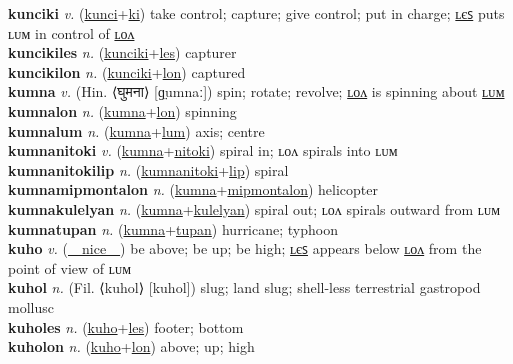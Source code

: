 \textbf{kunciki} \textit{v.} (\hyperref[kunci]{kunci}+\hyperref[ki]{ki})
take control; capture; give control; put in charge; \hyperref[kuncikiles]{ʟєꜱ} puts ʟᴜᴍ in control of \hyperref[kuncikilon]{ʟᴏᴧ} \label{kunciki} \\
\textbf{kuncikiles} \textit{n.} (\hyperref[kunciki]{kunciki}+\hyperref[les]{les})
capturer \label{kuncikiles} \\
\textbf{kuncikilon} \textit{n.} (\hyperref[kunciki]{kunciki}+\hyperref[lon]{lon})
captured \label{kuncikilon} \\
\textbf{kumna} \textit{v.} (Hin. ⟨घुमना⟩ [ɡ̤umnaː])
spin; rotate; revolve; \hyperref[kumnalon]{ʟᴏᴧ} is spinning about \hyperref[kumnalum]{ʟᴜᴍ} \label{kumna} \\
\textbf{kumnalon} \textit{n.} (\hyperref[kumna]{kumna}+\hyperref[lon]{lon})
spinning \label{kumnalon} \\
\textbf{kumnalum} \textit{n.} (\hyperref[kumna]{kumna}+\hyperref[lum]{lum})
axis; centre \label{kumnalum} \\
\textbf{kumnanitoki} \textit{v.} (\hyperref[kumna]{kumna}+\hyperref[nitoki]{nitoki})
spiral in; ʟᴏᴧ spirals into ʟᴜᴍ \label{kumnanitoki} \\
\textbf{kumnanitokilip} \textit{n.} (\hyperref[kumnanitoki]{kumnanitoki}+\hyperref[lip]{lip})
spiral \label{kumnanitokilip} \\
\textbf{kumnamipmontalon} \textit{n.} (\hyperref[kumna]{kumna}+\hyperref[mipmontalon]{mipmontalon})
helicopter \label{kumnamipmontalon} \\
\textbf{kumnakulelyan} \textit{n.} (\hyperref[kumna]{kumna}+\hyperref[kulelyan]{kulelyan})
spiral out; ʟᴏᴧ spirals outward from ʟᴜᴍ \label{kumnakulelyan} \\
\textbf{kumnatupan} \textit{n.} (\hyperref[kumna]{kumna}+\hyperref[tupan]{tupan})
hurricane; typhoon \label{kumnatupan} \\
\textbf{kuho} \textit{v.} (\hyperref[nice]{~~nice~~})
be above; be up; be high; \hyperref[kuholes]{ʟєꜱ} appears below \hyperref[kuholon]{ʟᴏᴧ} from the point of view of ʟᴜᴍ \label{kuho} \\
\textbf{kuhol} \textit{n.} (Fil. ⟨kuhol⟩ [kuhol])
slug; land slug; shell-less terrestrial gastropod mollusc \label{kuhol} \\
\textbf{kuholes} \textit{n.} (\hyperref[kuho]{kuho}+\hyperref[les]{les})
footer; bottom \label{kuholes} \\
\textbf{kuholon} \textit{n.} (\hyperref[kuho]{kuho}+\hyperref[lon]{lon})
above; up; high \label{kuholon} \\
